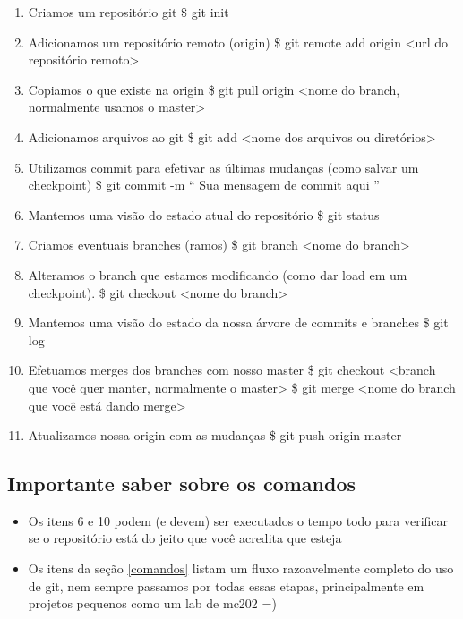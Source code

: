 \documentclass[12pt]{article}
\begin{document}
\begin{doublespacing}
\begin{enumerate}
\item{Criamos um repositório git \newline
\$ git init
}  
\item{Adicionamos um repositório remoto (origin) \newline
\$ git remote add origin <url do repositório remoto>
}

\item{Copiamos o que existe na origin \newline
\$ git pull origin <nome do branch, normalmente usamos o master> 
}
\item{Adicionamos arquivos ao git \newline
\$ git add <nome dos arquivos ou diretórios>
}
\item{Utilizamos commit para efetivar as últimas mudanças (como salvar um checkpoint) \newline
\$ git commit -m “ Sua mensagem de commit aqui ”
}
\item{Mantemos uma visão do estado atual do repositório \newline
\$ git status
}
\item{Criamos eventuais branches (ramos) \newline
\$ git branch <nome do branch>
}
\item{Alteramos o branch que estamos modificando (como dar load em um checkpoint). \newline
	\$ git checkout <nome do branch>  
}
\item{Mantemos uma visão do estado da nossa árvore de commits e branches \newline
\$ git log
}
\item{Efetuamos merges dos branches com nosso master \newline
	\$ git checkout <branch que você quer manter, normalmente o master> \newline
    \$ git merge <nome do branch que você está dando merge>
}
\item{Atualizamos nossa origin com as mudanças \newline
	\$ git push origin master
}
\end{enumerate}

\subsection{Importante saber sobre os comandos}
\begin{itemize}

\item{Os itens 6 e 10 podem (e devem) ser executados o tempo todo para verificar se o repositório está do jeito que você acredita que esteja
}
\item{Os itens da seção \ref{comandos} listam um fluxo razoavelmente completo do uso de git, nem sempre passamos por todas essas etapas, principalmente em projetos pequenos como um lab de mc202 =)
}


\end{itemize}
\end{doublespacing}
\end{document}
